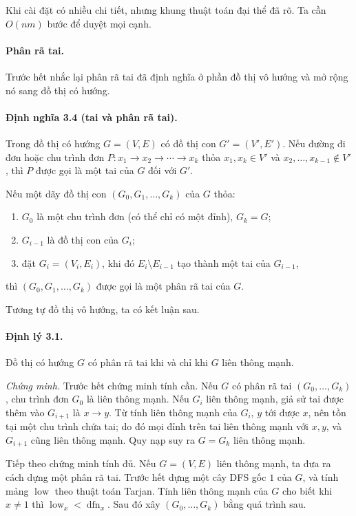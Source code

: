 \documentclass[11pt]{article}
\renewcommand{\leadsto}{\mathrel{\longrightarrow}}
\begin{document}
Khi cài đặt có nhiều chi tiết, nhưng khung thuật toán đại thể đã rõ. Ta cần
$O(nm)$ bước để duyệt mọi cạnh.

\paragraph{Phân rã tai.}
Trước hết nhắc lại phân rã tai đã định nghĩa ở phần đồ thị vô hướng và mở rộng
nó sang đồ thị có hướng.

\paragraph{Định nghĩa 3.4 (tai và phân rã tai).}
Trong đồ thị có hướng $G=(V,E)$ có đồ thị con $G'=(V',E')$. Nếu đường đi đơn
hoặc chu trình đơn $P:x_1\to x_2\to\cdots\to x_k$ thỏa
$x_1,x_k\in V'$ và $x_2,\ldots,x_{k-1}\notin V'$, thì $P$ được gọi là một tai
của $G$ đối với $G'$.

Nếu một dãy đồ thị con $(G_0,G_1,\ldots,G_k)$ của $G$ thỏa:
\begin{enumerate}
  \item $G_0$ là một chu trình đơn (có thể chỉ có một đỉnh), $G_k=G$;
  \item $G_{i-1}$ là đồ thị con của $G_i$;
  \item đặt $G_i=(V_i,E_i)$, khi đó $E_i\setminus E_{i-1}$ tạo thành một tai
  của $G_{i-1}$,
\end{enumerate}
thì $(G_0,G_1,\ldots,G_k)$ được gọi là một phân rã tai của $G$.

Tương tự đồ thị vô hướng, ta có kết luận sau.

\paragraph{Định lý 3.1.}
Đồ thị có hướng $G$ có phân rã tai khi và chỉ khi $G$ liên thông mạnh.

\emph{Chứng minh.}
Trước hết chứng minh tính cần. Nếu $G$ có phân rã tai $(G_0,\ldots,G_k)$, chu
trình đơn $G_0$ là liên thông mạnh. Nếu $G_i$ liên thông mạnh, giả sử tai được
thêm vào $G_{i+1}$ là $x\leadsto y$. Từ tính liên thông mạnh của $G_i$, $y$ tới
được $x$, nên tồn tại một chu trình chứa tai; do đó mọi đỉnh trên tai liên thông
mạnh với $x,y$, và $G_{i+1}$ cũng liên thông mạnh. Quy nạp suy ra $G=G_k$ liên
thông mạnh.

Tiếp theo chứng minh tính đủ. Nếu $G=(V,E)$ liên thông mạnh, ta đưa ra cách dựng
một phân rã tai. Trước hết dựng một cây DFS gốc $1$ của $G$, và tính mảng
$\operatorname{low}$ theo thuật toán Tarjan. Tính liên thông mạnh của $G$ cho
biết khi $x\ne1$ thì $\operatorname{low}_x<\operatorname{dfn}_x$. Sau đó xây
$(G_0,\ldots,G_k)$ bằng quá trình sau.
\end{document}
